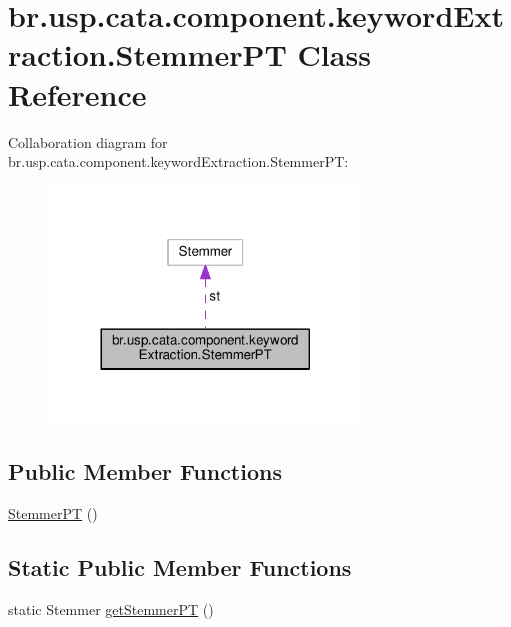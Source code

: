 \hypertarget{classbr_1_1usp_1_1cata_1_1component_1_1keyword_extraction_1_1_stemmer_p_t}{\section{br.\+usp.\+cata.\+component.\+keyword\+Extraction.\+Stemmer\+P\+T Class Reference}
\label{classbr_1_1usp_1_1cata_1_1component_1_1keyword_extraction_1_1_stemmer_p_t}
}


Collaboration diagram for br.\+usp.\+cata.\+component.\+keyword\+Extraction.\+Stemmer\+P\+T\+:\nopagebreak
\begin{figure}[H]
\begin{center}
\leavevmode
\includegraphics[width=236pt]{classbr_1_1usp_1_1cata_1_1component_1_1keyword_extraction_1_1_stemmer_p_t__coll__graph}
\end{center}
\end{figure}
\subsection*{Public Member Functions}
\begin{DoxyCompactItemize}
\item 
\hyperlink{classbr_1_1usp_1_1cata_1_1component_1_1keyword_extraction_1_1_stemmer_p_t_afa5c81c9ed2875171f28d35d454dd664}{Stemmer\+P\+T} ()
\end{DoxyCompactItemize}
\subsection*{Static Public Member Functions}
\begin{DoxyCompactItemize}
\item 
static Stemmer \hyperlink{classbr_1_1usp_1_1cata_1_1component_1_1keyword_extraction_1_1_stemmer_p_t_a9defade5b0e4ba5612a60aae53de287b}{get\+Stemmer\+P\+T} ()
\end{DoxyCompactItemize}
